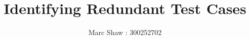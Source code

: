 \documentclass[11pt
              , a4paper
              , twoside
              , openright
              ]{report}
\title{Identifying Redundant Test Cases}
\author{Marc Shaw : 300252702}
\date{}
\begin{document}
\frontmatter



\begin{abstract}


\end{abstract}


\maketitle

\tableofcontents


\listoftables


\mainmatter










\backmatter



%


\end{document}
